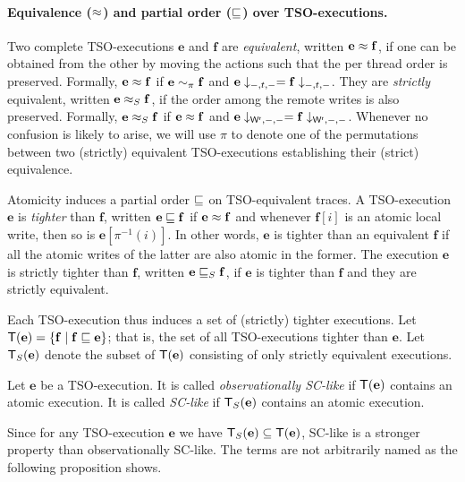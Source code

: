 \paragraph{Equivalence ($\approx$) and partial order ($\sqsubseteq$) over TSO-executions.}
Two complete TSO-executions $\mathbf{e}$ and $\mathbf{f}$ are {\em equivalent}, written $\mathbf{e}\approx\mathbf{f}$, if one can be obtained from the other by moving the actions such that the per thread order is preserved.
Formally, $\mathbf{e}\approx\mathbf{f}$ if $\mathbf{e}\sim_{\pi}\mathbf{f}$ and $\mathbf{e}\downarrow_{-,t,-}=\mathbf{f}\downarrow_{-,t,-}$.
They are {\em strictly} equivalent, written $\mathbf{e}\approx_S\mathbf{f}$, if the order among the remote writes is also preserved.
Formally, $\mathbf{e}\approx_S\mathbf{f}$ if $\mathbf{e}\approx\mathbf{f}$ and $\mathbf{e}\downarrow_{\mathsf{W}^{\mathsf{r}},-,-}=\mathbf{f}\downarrow_{\mathsf{W}^{\mathsf{r}},-,-}$.
Whenever no confusion is likely to arise, we will use $\pi$ to denote one of the permutations between two (strictly) equivalent TSO-executions establishing their (strict) equivalence.

Atomicity induces a partial order $\sqsubseteq$ on TSO-equivalent traces.
A TSO-execution $\mathbf{e}$ is {\em tighter} than $\mathbf{f}$, written $\mathbf{e}\sqsubseteq\mathbf{f}$ if $\mathbf{e}\approx\mathbf{f}$ and whenever $\mathbf{f}[i]$ is an atomic local write, then so is $\mathbf{e}[\pi^{-1}(i)]$.
In other words, $\mathbf{e}$ is tighter than an equivalent $\mathbf{f}$ if all the atomic writes of the latter are also atomic in the former. 
The execution $\mathbf{e}$ is strictly tighter than $\mathbf{f}$, written $\mathbf{e}\sqsubseteq_S\mathbf{f}$, if $\mathbf{e}$ is tighter than $\mathbf{f}$ and they are strictly equivalent.

Each TSO-execution thus induces a set of (strictly) tighter executions.
Let $\mathsf{T}(\mathbf{e})=\{\mathbf{f} \mid \mathbf{f}\sqsubseteq\mathbf{e}\}$; that is, the set of all TSO-executions tighter than $\mathbf{e}$.
Let $\mathsf{T}_S(\mathbf{e})$ denote the subset of $\mathsf{T}(\mathbf{e})$ consisting of only strictly equivalent executions.

\begin{definition}[SC-like]
Let $\mathbf{e}$ be a TSO-execution.
It is called {\em observationally SC-like} if $\mathsf{T}(\mathbf{e})$ contains an atomic execution.
It is called {\em SC-like} if $\mathsf{T}_S(\mathbf{e})$ contains an atomic execution.
\end{definition}
Since for any TSO-execution $\mathbf{e}$ we have $\mathsf{T}_S(\mathbf{e})\subseteq \mathsf{T}(\mathbf{e})$, SC-like is a stronger property than observationally SC-like.
The terms are not arbitrarily named as the following proposition shows.

